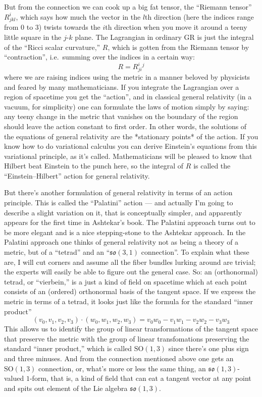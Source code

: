 \documentclass{article}
\begin{document}
But from the connection we can cook up a big fat tensor, the ``Riemann
tensor'' \(R^i_{jkl}\), which says how much the vector in the \(l\)th
direction (here the indices range from 0 to 3) twists towards the
\(i\)th direction when you move it around a teeny little square in the
\(j\)-\(k\) plane. The Lagrangian in ordinary GR is just the integral of
the ``Ricci scalar curvature,'' \(R\), which is gotten from the Riemann
tensor by ``contraction'', i.e.~summing over the indices in a certain
way: \[R = R^i_{ji}{}^j\] where we are raising indices using the metric
in a manner beloved by physicists and feared by many mathematicians. If
you integrate the Lagrangian over a region of spacetime you get the
``action'', and in classical general relativity (in a vacuum, for
simplicity) one can formulate the laws of motion simply by saying: any
teeny change in the metric that vanishes on the boundary of the region
should leave the action constant to first order. In other words, the
solutions of the equations of general relativity are the *stationary
points* of the action. If you know how to do variational calculus you
can derive Einstein's equations from this variational principle, as it's
called. Mathematicians will be pleased to know that Hilbert beat
Einstein to the punch here, so the integral of \(R\) is called the
``Einstein--Hilbert'' action for general relativity.

But there's another formulation of general relativity in terms of an
action principle. This is called the ``Palatini'' action --- and
actually I'm going to describe a slight variation on it, that is
conceptually simpler, and apparently appears for the first time in
Ashtekar's book. The Palatini approach turns out to be more elegant and
is a nice stepping-stone to the Ashtekar approach. In the Palatini
approach one thinks of general relativity not as being a theory of a
metric, but of a ``tetrad'' and an ``\(\mathfrak{so}(3,1)\)
connection''. To explain what these are, I will cut corners and assume
all the fiber bundles lurking around are trivial; the experts will
easily be able to figure out the general case. So: an (orthonormal)
tetrad, or ``vierbein,'' is a just a kind of field on spacetime which at
each point consists of an (ordered) orthonormal basis of the tangent
space. If we express the metric in terms of a tetrad, it looks just like
the formula for the standard ``inner product''
\[(v_0,v_1,v_2,v_3)\cdot(w_0,w_1,w_2,w_3) = v_0w_0 -v_1w_1 -v_2w_2 -v_3w_3\]
This allows us to identify the group of linear transformations of the
tangent space that preserve the metric with the group of linear
transfomations preserving the standard ``inner product,'' which is
called \(\mathrm{SO}(1,3)\) since there's one plus sign and three
minuses. And from the connection mentioned above one gets an
\(\mathrm{SO}(1,3)\) connection, or, what's more or less the same thing,
an \(\mathfrak{so}(1,3)\)-valued \(1\)-form, that is, a kind of field
that can eat a tangent vector at any point and spits out element of the
Lie algebra \(\mathfrak{so}(1,3)\).
\end{document}
